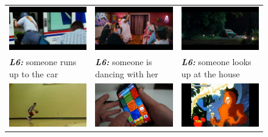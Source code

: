 \begin{figure}[thp]
  \begin{center}
  \newcommand{\mcCell}[1]{%
  \multicolumn{1}{c}{#1}}
  \centering
  \begin{adjustbox}{center}
  \tabcolsep=0.10cm
  \begin{tabular}{lll}
    \mcCell{\includegraphics[width=0.25\linewidth]{images/LsmdcVid0.png}} &
    \mcCell{\includegraphics[width=0.25\linewidth]{images/LsmdcVid1.png}} &
    \mcCell{\includegraphics[width=0.25\linewidth]{images/LsmdcVid2.png}}
    \vspace{-2mm}\\
    \textbf{\scriptsize\em L6:} \scriptsize someone runs up to the car&
    \textbf{\scriptsize\em L6:} \scriptsize someone is dancing with her&
    \textbf{\scriptsize\em L6:} \scriptsize someone looks up at the house\medskip\\
    \mcCell{\includegraphics[width=0.25\linewidth]{images/9150.png}} &
    \mcCell{\includegraphics[width=0.25\linewidth]{images/9799.png}} &
    \mcCell{\includegraphics[width=0.25\linewidth]{images/7997.png}}\vspace{-2mm} \\

\end{tabular}
\end{adjustbox}
\end{center}
\end{figure}
